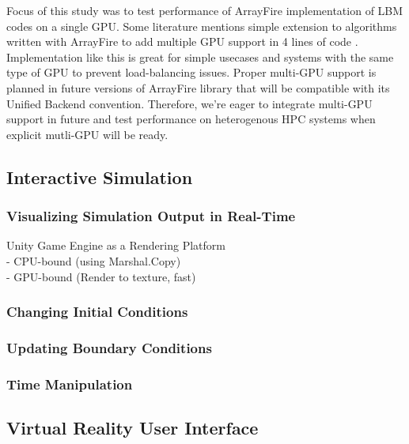 Focus of this study was to test performance of ArrayFire implementation of LBM codes on a single GPU. Some literature mentions simple extension to algorithms written with ArrayFire to add multiple GPU support in 4 lines of code \cite{malcolmArrayFireGPUAcceleration2012}. Implementation like this is great for simple usecases and systems with the same type of GPU to prevent load-balancing issues. Proper multi-GPU support is planned in future versions of ArrayFire library that will be compatible with its Unified Backend convention. Therefore, we're eager to integrate multi-GPU support in future and test performance on heterogenous HPC systems when explicit mutli-GPU will be ready.


\subsection{Interactive Simulation}

\subsubsection{Visualizing Simulation Output in Real-Time}

Unity Game Engine as a Rendering Platform \\

- CPU-bound (using Marshal.Copy) \\
- GPU-bound (Render to texture, fast) \\

\subsubsection{Changing Initial Conditions}

\subsubsection{Updating Boundary Conditions}

\subsubsection{Time Manipulation}


\subsection{Virtual Reality User Interface}

